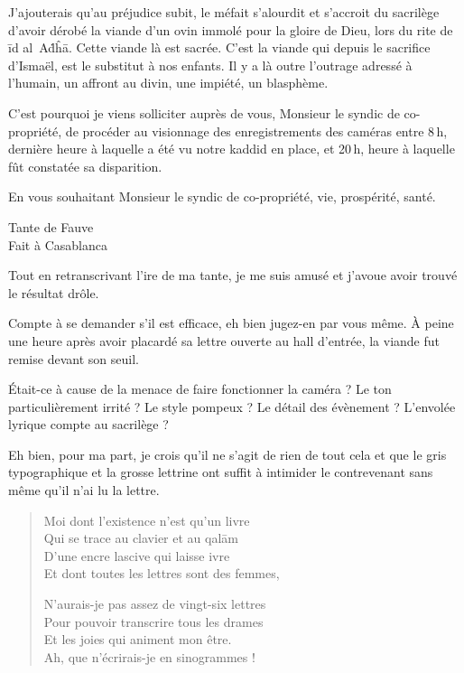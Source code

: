 J’ajouterais qu’au préjudice subit, le méfait s’alourdit et s’accroit du sacrilège d’avoir dérobé la viande d’un ovin immolé pour la gloire de Dieu, lors du rite de īd al Aḋĥā. Cette viande là est sacrée. C’est la viande qui depuis le sacrifice d’Ismaël, est le substitut à nos enfants. Il y a là outre l’outrage adressé à l’humain, un affront au divin, une
impiété, un blasphème.

C’est pourquoi je viens solliciter auprès de vous, Monsieur le syndic de co-propriété, de procéder au visionnage des enregistrements des caméras entre 8\,h, dernière heure à laquelle a été vu
notre kaddid en place, et 20\,h, heure à laquelle fût constatée sa disparition.

En vous souhaitant Monsieur le syndic de co-propriété, vie, prospérité, santé.
\nopagebreak\\\vspace{1cm}\nopagebreak
\hfill\nopagebreak
\begin{minipage}{4cm}
  \begin{center}
    \vspace{1cm}
    Tante de Fauve\\  %
    Fait à Casablanca
  \end{center}
\end{minipage}


\begin{prose}
  Tout en retranscrivant l’ire de ma tante, je me suis amusé et j’avoue avoir trouvé le résultat drôle.

  Compte à se demander s’il est efficace, eh bien jugez-en par vous même. À peine une heure après avoir placardé sa lettre ouverte au hall d’entrée, la viande fut remise devant son seuil.

  Était-ce à cause de la menace de faire fonctionner la caméra ? Le ton particulièrement irrité ? Le style pompeux ? Le détail des évènement ? L’envolée lyrique compte au sacrilège ?

  Eh bien, pour ma part, je crois qu’il ne s’agit de rien de tout cela et que le gris typographique et la grosse lettrine ont suffit à intimider le contrevenant sans même qu’il n’ai lu la lettre.
\end{prose}

\begin{verse}%
  \quatrain%
  Moi dont l’existence n’est qu’un livre\\  %
  Qui se trace au clavier et au qalām\\  %
  D’une encre lascive qui laisse ivre\\  %
  Et dont toutes les lettres sont des femmes,

  N’aurais-je pas assez de vingt-six lettres\\  %
  Pour pouvoir transcrire tous les drames\\  %
  Et les joies  qui animent mon être.\\  %
  Ah, que n’écrirais-je en sinogrammes !
\end{verse}

